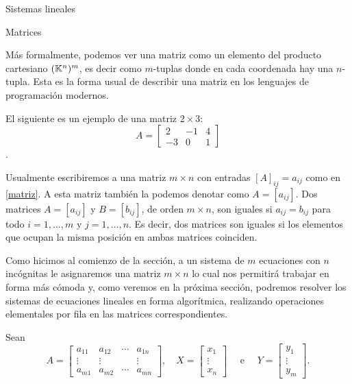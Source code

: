 \begin{chapter}{Sistemas lineales}
\begin{section}{Matrices}
            \begin{observacion*}
                Más formalmente, podemos ver una matriz como un elemento del producto cartesiano $(\mathbb K^n)^m$, es decir como $m$-tuplas donde en cada coordenada hay una $n$-tupla. Esta es la forma usual de describir una matriz en los lenguajes de programación modernos. 
            \end{observacion*}
            
            \begin{ejemplo*}
                El siguiente es un ejemplo de una matriz $2 \times 3$:
                \begin{equation*}
                A = \begin{bmatrix}
                2& -1& 4 \\
                -3 &0&1
                \end{bmatrix}
                \end{equation*} .
            \end{ejemplo*}
            
            Usualmente escribiremos a una matriz $m \times  n$   con entradas  $[A]_{ij} = a_{ij}$ como en \eqref{matriz}. A esta matriz también la podemos denotar como $A = [a_{ij}]$. Dos matrices $A = [a_{ij}]$ y $B = [b_{ij}]$, de orden $m \times n$, son iguales si $a_{ij} = b_{ij}$ para todo $i = 1,\ldots,m$  y $j = 1,\ldots,n$. Es decir, dos matrices son iguales si los elementos que ocupan la misma posición en ambas matrices coinciden.
            
            Como hicimos al comienzo de la sección, a un sistema de $m$ ecuaciones con $n$ incógnitas le asignaremos una matriz $m \times  n$  lo cual nos permitirá trabajar en forma más cómoda y, como veremos en la próxima sección,  podremos resolver los sistemas de ecuaciones lineales en forma algorítmica, realizando operaciones elementales por fila en las matrices correspondientes. 
            
            Sean
            \begin{equation*}
                A = \begin{bmatrix}
                    a_{11}& a_{12}& \cdots &a_{1n} \\
                    \vdots&\vdots  &  &\vdots \\
                    a_{m1} &a_{m2}&\cdots &a_{mn}
                    \end{bmatrix}, \quad 
                    X = \begin{bmatrix}
                    x_1 \\ \vdots \\ x_n
                    \end{bmatrix}\quad \text{ e } \quad
                    Y = \begin{bmatrix}
                    y_1 \\ \vdots \\ y_m
                    \end{bmatrix}. 
            \end{equation*}
                

\end{section}
\end{chapter}
